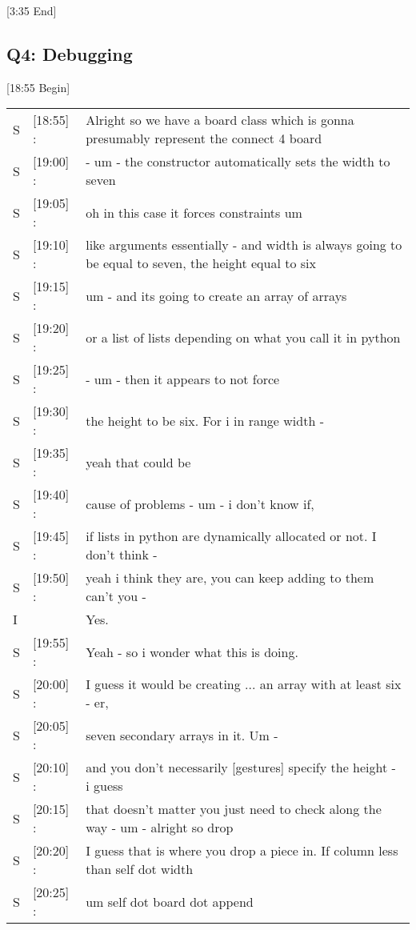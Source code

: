 [3:35 End]



\subsection{Q4: Debugging}

[18:55 Begin] \\
\begin{tabular}{llp{13cm}}
S&[18:55] :& Alright so we have a board class which is gonna presumably represent the connect 4 board  \\
S&[19:00] :& - um - the constructor automatically sets the width to seven \\
S&[19:05] :& oh in this case it forces constraints um \\
S&[19:10] :& like arguments essentially - and width is always going to be equal to seven, the height equal to six \\
S&[19:15] :& um - and its going to create an array of arrays \\
S&[19:20] :& or a list of lists depending on what you call it in python \\
S&[19:25] :& - um - then it appears to not force \\
S&[19:30] :& the height to be six. For i in range width - \\ 
S&[19:35] :& yeah that could be \\
S&[19:40] :& cause of problems - um - i don't know if, \\
S&[19:45] :& if lists in python are dynamically allocated or not. I don't think - \\
S&[19:50] :& yeah i think they are, you can keep adding to them can't you - \\
I&& Yes. \\
S&[19:55] :& Yeah - so i wonder what this is doing. \\
S&[20:00] :& I guess it would be creating ... an array with at least six - er, \\
S&[20:05] :& seven secondary arrays in it. Um - \\
S&[20:10] :& and you don't necessarily [gestures] specify the height - i guess \\
S&[20:15] :& that doesn't matter you just need to check along the way - um - alright so drop \\
S&[20:20] :& I guess that is where you drop a piece in. If column less than self dot width \\
S&[20:25] :& um self dot board dot append \\

\end{tabular}
